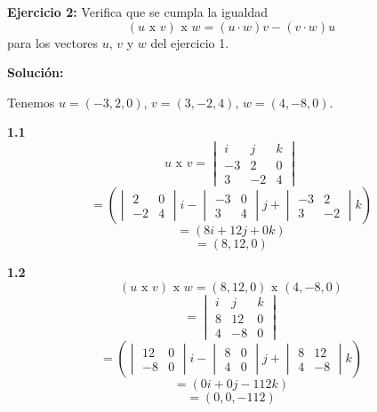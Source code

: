 \documentclass{article}
\begin{document}
\textbf{Ejercicio 2:} Verifica que se cumpla la igualdad $$(u \text{ x } v)\text{ x }w = (u\cdot w)v -(v\cdot w)u$$ para los
vectores $u$, $v$ y $w$ del ejercicio 1.
\vspace{10pt}


\textbf{Solución:}
\vspace{10pt}


Tenemos $u =(-3, 2, 0)$, $v =(3,-2, 4)$, $w =(4,-8,0)$.
\vspace{10pt}


\begin{minipage}[c]{0.5cm}
   \textbf{1.1}
   $$u \text{ x } v = \begin{vmatrix}
       i & j & k \\
       -3 & 2 & 0 \\
       3 & -2 & 4
   \end{vmatrix}$$
   $$= \left(\begin{vmatrix}
       2 & 0 \\
       -2 & 4
   \end{vmatrix}i - \begin{vmatrix}
       -3 & 0 \\
       3 & 4
   \end{vmatrix}j + \begin{vmatrix}
       -3 & 2 \\
       3 & -2
   \end{vmatrix}k\right)$$
   $$=(8i+12j+0k )$$
   $$=(8, 12, 0)$$
\end{minipage}\hspace*{6cm}\begin{minipage}[c]{0.5cm}
   \textbf{1.2}
   $$(u \text{ x } v)\text{ x }w = (8, 12, 0) \text{ x }(4,-8,0)$$
   $$=\begin{vmatrix}
       i & j & k \\
       8 & 12 & 0 \\
       4 & -8 & 0
   \end{vmatrix}$$
   $$= \left(\begin{vmatrix}
       12 & 0 \\
       -8 & 0
   \end{vmatrix}i - \begin{vmatrix}
       8 & 0 \\
       4 & 0
   \end{vmatrix}j + \begin{vmatrix}
       8 & 12 \\
       4 & -8
   \end{vmatrix}k\right)$$
   $$= (0i + 0j -112k)$$
   $$= (0, 0, -112)$$
\end{minipage}
\vspace{10pt}
\end{document}
